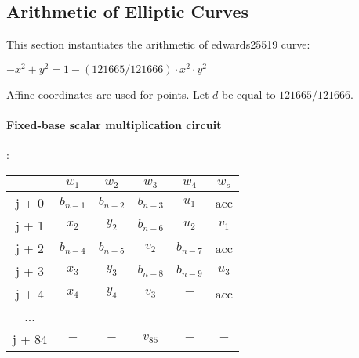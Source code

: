 \subsection{Arithmetic of Elliptic Curves} \label{ellcurve}
This section instantiates the arithmetic of edwards25519 curve:
\begin{center}
$- x^2 + y^2 = 1 - (121665/121666) \cdot x^2 \cdot y^2$
\end{center}
Affine coordinates are used for points. 
Let $d$ be equal to $121665/121666$.

\paragraph{Fixed-base scalar multiplication circuit}:
\begin{center}
\begin{tabular}{ c|c|c|c|c|c } 
  & $w_1$ & $w_2$ & $w_3$ & $w_4$ & $w_o$\\ 
 \hline
j + 0 & $b_{n - 1}$ & $b_{n - 2}$ & $b_{n - 3}$ & $u_1$ & acc\\ 
j + 1 & $x_2$ & $y_2$ & $b_{n - 6}$ & $u_2$ & $v_1$\\ 
j + 2 & $b_{n - 4}$ & $b_{n - 5}$ & $v_2$ & $b_{n - 7}$ & acc\\ 
j + 3 & $x_3$ & $ y_3$ & $b_{n - 8}$ & $b_{n - 9}$ & $u_3$\\ 
j + 4 & $x_4$ & $y_4$ & $v_3$ & $-$ & acc\\ 
... & & & & &\\ 
j + 84 & $-$ & $-$ & $v_{85}$ & $-$ & $-$ \\ 
\end{tabular}
\end{center}


